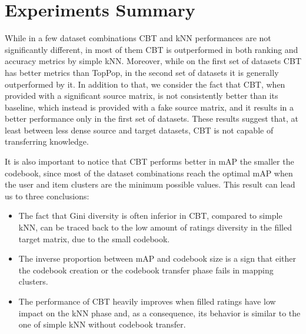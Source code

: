 \clearpage


\section{Experiments Summary}

While in a few dataset combinations CBT and kNN performances are not significantly different, in most of them CBT is outperformed in both ranking and accuracy metrics by simple kNN. Moreover, while on the first set of datasets CBT has better metrics than TopPop, in the second set of datasets it is generally outperformed by it. In addition to that, we consider the fact that CBT, when provided with a significant source matrix, is not consistently better than its baseline, which instead is provided with a fake source matrix, and it results in a better performance only in the first set of datasets. These results suggest that, at least between less dense source and target datasets, CBT is not capable of transferring knowledge.\par
It is also important to notice that CBT performs better in mAP the smaller the codebook, since most of the dataset combinations reach the optimal mAP when the user and item clusters are the minimum possible values. This result can lead us to three conclusions:
\begin{itemize}
\item The fact that Gini diversity is often inferior in CBT, compared to simple kNN, can be traced back to the low amount of ratings diversity in the filled target matrix, due to the small codebook.
\item The inverse proportion between mAP and codebook size is a sign that either the codebook creation or the codebook transfer phase fails in mapping clusters.
\item The performance of CBT heavily improves when filled ratings have low impact on the kNN phase and, as a consequence, its behavior is similar to the one of simple kNN without codebook transfer.
\end{itemize}
